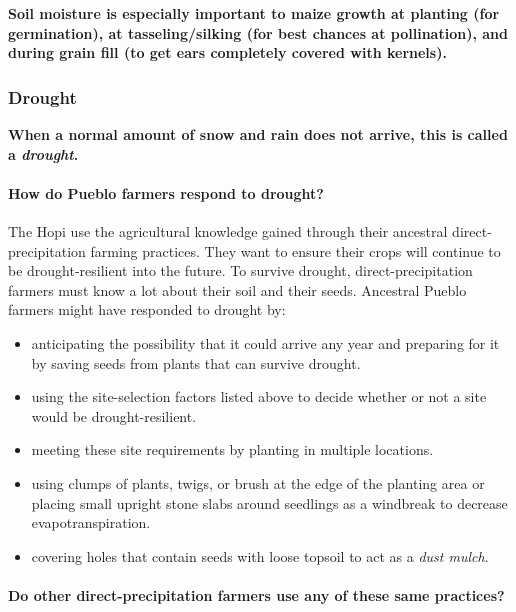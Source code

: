 \documentclass[12pt,]{article}
\providecommand{\tightlist}{%
  \setlength{\itemsep}{0pt}\setlength{\parskip}{0pt}}
\let\oldparagraph\paragraph
\renewcommand{\paragraph}[1]{\oldparagraph{#1}\mbox{}}
\begin{document}
\textbf{Soil moisture is especially important to maize growth at planting (for germination), at tasseling/silking (for best chances at pollination), and during grain fill (to get ears completely covered with kernels).}

\hypertarget{drought}{%
\subsubsection*{Drought}\label{drought}}

\textbf{When a normal amount of snow and rain does not arrive, this is called a \emph{drought}.}

\hypertarget{how-do-pueblo-farmers-respond-to-drought}{%
\paragraph{How do Pueblo farmers respond to drought?}\label{how-do-pueblo-farmers-respond-to-drought}}

The Hopi use the agricultural knowledge gained through their ancestral direct-precipitation farming practices. They want to ensure their crops will continue to be drought-resilient into the future. To survive drought, direct-precipitation farmers must know a lot about their soil and their seeds. Ancestral Pueblo farmers might have responded to drought by:

\begin{itemize}
\tightlist
\item
  anticipating the possibility that it could arrive any year and preparing for it by saving seeds from plants that can survive drought.
\item
  using the site-selection factors listed above to decide whether or not a site would be drought-resilient.
\item
  meeting these site requirements by planting in multiple locations.
\item
  using clumps of plants, twigs, or brush at the edge of the planting area or placing small upright stone slabs around seedlings as a windbreak to decrease evapotranspiration.
\item
  covering holes that contain seeds with loose topsoil to act as a \emph{dust mulch}.
\end{itemize}

\hypertarget{do-other-direct-precipitation-farmers-use-any-of-these-same-practices}{%
\paragraph{Do other direct-precipitation farmers use any of these same practices?}\label{do-other-direct-precipitation-farmers-use-any-of-these-same-practices}}
\end{document}
